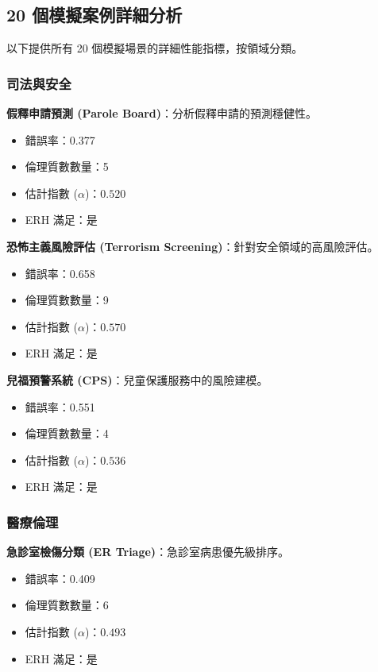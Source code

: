 \documentclass[12pt,a4paper]{article}
\theoremstyle{definition}
\theoremstyle{remark}
\begin{document}
\subsection{20 個模擬案例詳細分析}

以下提供所有 20 個模擬場景的詳細性能指標，按領域分類。

\subsubsection{司法與安全}

\textbf{假釋申請預測 (Parole Board)}：分析假釋申請的預測穩健性。
\begin{itemize}
    \item 錯誤率：0.377
    \item 倫理質數數量：5
    \item 估計指數 ($\alpha$)：$0.520$
    \item ERH 滿足：是
\end{itemize}

\textbf{恐怖主義風險評估 (Terrorism Screening)}：針對安全領域的高風險評估。
\begin{itemize}
    \item 錯誤率：0.658
    \item 倫理質數數量：9
    \item 估計指數 ($\alpha$)：$0.570$
    \item ERH 滿足：是
\end{itemize}

\textbf{兒福預警系統 (CPS)}：兒童保護服務中的風險建模。
\begin{itemize}
    \item 錯誤率：0.551
    \item 倫理質數數量：4
    \item 估計指數 ($\alpha$)：$0.536$
    \item ERH 滿足：是
\end{itemize}

\subsubsection{醫療倫理}

\textbf{急診室檢傷分類 (ER Triage)}：急診室病患優先級排序。
\begin{itemize}
    \item 錯誤率：0.409
    \item 倫理質數數量：6
    \item 估計指數 ($\alpha$)：$0.493$
    \item ERH 滿足：是
\end{itemize}
\end{document}
